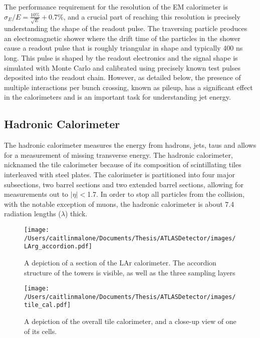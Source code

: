 The performance requirement for the resolution of the EM calorimeter is $\sigma_E/E=\frac{10\%}{\sqrt{E}}+$0.7\%, and a crucial part of reaching this resolution is precisely understanding the shape of the readout pulse.  The traversing particle produces an electromagnetic shower where the drift time of the particles in the shower cause a readout pulse that is roughly triangular in shape and typically 400 ns long.  This pulse is shaped by the readout electronics and the signal shape is simulated with Monte Carlo and calibrated using precisely known test pulses deposited into the readout chain.  However, as detailed below, the presence of multiple interactions per bunch crossing, known as pileup, has a significant effect in the calorimeters and is an important task for understanding jet energy.

\subsection{Hadronic Calorimeter} 
\label{sec:h_cal}
The hadronic calorimeter measures the energy from hadrons, jets, taus and allows for a measurement of missing transverse energy.  The hadronic calorimeter, nicknamed the tile calorimeter because of its composition of scintillating tiles interleaved with steel plates.  The calorimeter is partitioned into four major subsections, two barrel sections and two extended barrel sections, allowing for measurements out to $|\eta|<$1.7.  In order to stop all particles from the collision, with the notable exception of muons, the hadronic calorimeter is about 7.4 radiation lengths ($\lambda$) thick.


\begin{figure}
	\texttt{[image: /Users/caitlinmalone/Documents/Thesis/ATLASDetector/images/LArg\_accordion.pdf]}		\label{fig:lar}
	\caption{A depiction of a section of the LAr calorimeter.  The accordion structure of the towers is visible, as well as the three sampling layers}
	\texttt{[image: /Users/caitlinmalone/Documents/Thesis/ATLASDetector/images/tile\_cal.pdf]}
	\label{fig:tile_cal}
	\caption{A depiction of the overall tile calorimeter, and a close-up view of one of its cells.}
\end{figure}



